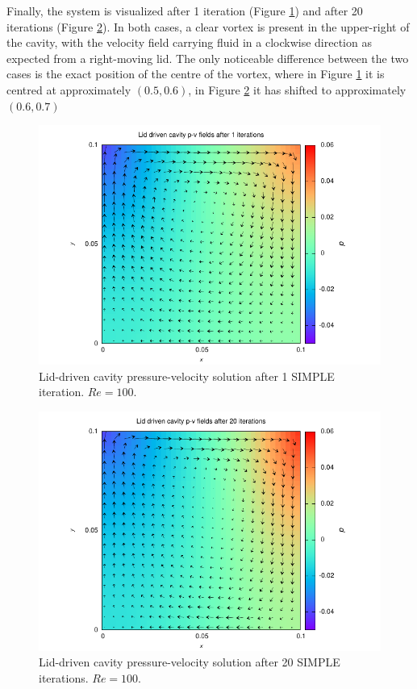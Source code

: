 \documentclass[final,3p,times,twocolumn]{elsarticle}
\begin{document}
Finally, the system is visualized after 1 iteration (Figure \ref{fig:1iter}) and after 20 iterations (Figure \ref{fig:20iter}). In both cases, a clear vortex is present in the upper-right of the cavity, with the velocity field carrying fluid in a clockwise direction as expected from a right-moving lid. The only noticeable difference between the two cases is the exact position of the centre of the vortex, where in Figure \ref{fig:1iter} it is centred at approximately $(0.5, 0.6)$, in Figure \ref{fig:20iter} it has shifted to approximately $(0.6, 0.7)$

\begin{figure}[ht]
    \centering
    \includegraphics[width=\linewidth]{Report/images/1.pdf}
    \caption{Lid-driven cavity pressure-velocity solution after 1 SIMPLE iteration. $Re=100$. }
    \label{fig:1iter}
\end{figure}

\begin{figure}[ht]
    \centering
    \includegraphics[width=\linewidth]{Report/images/20.pdf}
    \caption{Lid-driven cavity pressure-velocity solution after 20 SIMPLE iterations. $Re=100$.}
    \label{fig:20iter}
\end{figure}
\end{document}
